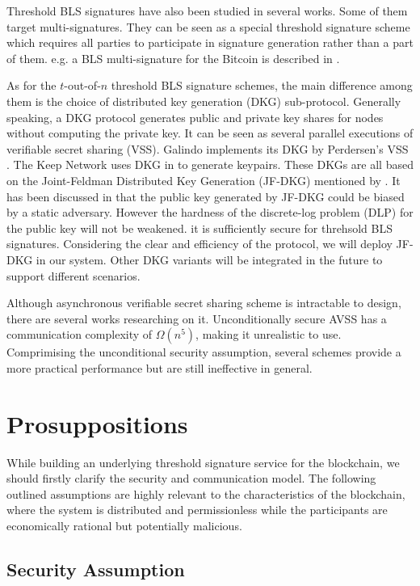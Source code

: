 \documentclass[11pt]{article}
\begin{document}
Threshold BLS signatures have also been studied in several works. Some of them target multi-signatures. They can be seen as a special threshold signature scheme which requires all parties to participate in signature generation rather than a part of them. e.g. a BLS multi-signature for the Bitcoin is described in \cite{boneh2018compact}. 

As for the $t$-out-of-$n$ threshold BLS signature schemes, the main difference among them is the choice of distributed key generation (DKG) sub-protocol. Generally speaking, a DKG protocol generates public and private key shares for nodes without computing the private key. It can be seen as several parallel executions of verifiable secret sharing (VSS). Galindo \cite{galindo2021fully} implements its DKG by Perdersen's VSS \cite{pedersen1991threshold}. The Keep Network \cite{keep2022doc} uses DKG in \cite{gennaro2007secure} to generate keypairs. These DKGs are all based on the Joint-Feldman Distributed Key Generation (JF-DKG) mentioned by \cite{pedersen1991non}. It has been discussed in \cite{gennaro2007secure} that the public key generated by JF-DKG could be biased by a static adversary. However the hardness of the discrete-log problem (DLP) for the public key will not be weakened. it is sufficiently secure for threhsold BLS signatures. Considering the clear and efficiency of the protocol, we will deploy JF-DKG in our system. Other DKG variants will be integrated in the future to support different scenarios.

Although asynchronous verifiable secret sharing scheme is intractable to design, there are several works researching on it. Unconditionally secure AVSS has a communication complexity of $\Omega(n^5)$, making it unrealistic to use. Comprimising the unconditional security assumption, several schemes provide a more practical performance but are still ineffective in general. 

\section{Prosuppositions}

While building an underlying threshold signature service for the blockchain, we should firstly clarify the security and communication model. The following outlined assumptions are highly relevant to the characteristics of the blockchain, where the system is distributed and permissionless while the participants are economically rational but potentially malicious.

\subsection{Security Assumption}
\end{document}
